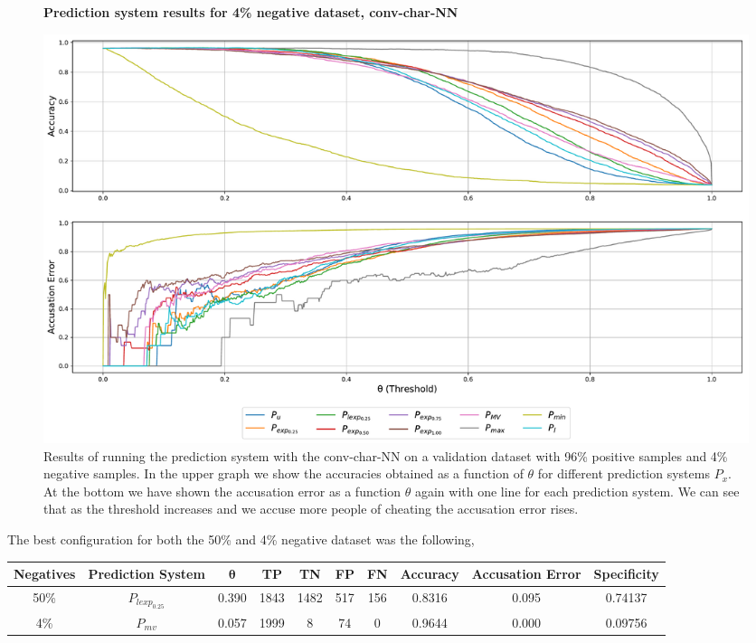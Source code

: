 \begin{figure}
    \centering
    \textbf{Prediction system results for 4\% negative dataset, \gls{conv-char-NN}}\par\medskip
    \includegraphics[scale=0.33]{./pictures/experiments/conv_char_nn/prediction_system_04}
    \caption{Results of running the prediction system with the
    \gls{conv-char-NN} on a validation dataset with 96\% positive samples and
    4\% negative samples. In the upper graph we show the accuracies obtained as
    a function of $\theta$ for different prediction systems $P_x$. At the bottom
    we have shown the accusation error as a function $\theta$ again with one
    line for each prediction system. We can see that as the threshold increases
    and we accuse more people of cheating the accusation error rises.}
    \label{fig:conv-char-NN-pred-4}
\end{figure}

The best configuration for both the 50\% and 4\% negative dataset was the
following,

\begin{adjustbox}{center}
    \scriptsize
    \begin{tabular}{|c|c|c|c|c|c|c|c|c|c|}
        \hline
        \textbf{Negatives} & \textbf{Prediction System} & $\mathbf{\theta}$ & \textbf{TP} & \textbf{TN} & \textbf{FP} & \textbf{FN} &
        \textbf{Accuracy} & \textbf{Accusation Error} & \textbf{Specificity}
        \\ \hline
        50\%       & $P_{lexp_{0.25}}$ & 0.390    & 1843 & 1482 & 517 & 156 &
        0.8316     & 0.095 & 0.74137
        \\ \hline
        4\%        & $P_{mv}$          & 0.057    & 1999 & 8    & 74  & 0   &
        0.9644     & 0.000 & 0.09756
        \\ \hline
    \end{tabular}
\end{adjustbox}


